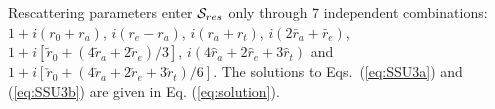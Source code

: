 \documentclass[aps,preprint,floats,epsf,epsfig,nofootinbib,letter]{revtex4}
\newcommand{\ov}{\overline}
\newcommand{\Sc}{{\cal S}}
\newcommand{\T}{{\cal T}}
\begin{document}





%








Rescattering
parameters enter $\Sc_{res}$ only through 7 independent
combinations: $1+i(r_0+r_a)$, $i(r_e-r_a)$, $i(r_a+r_t)$, $i(2\bar
r_a+\bar r_e)$, $1+i[\tilde r_0+(4\tilde r_a+2\tilde r_e)/3]$,
$i(4\hat r_a+2\hat r_e+3\hat r_t)$ and $1+i[\check r_0+(4\check
r_a+2\check r_e+3\check r_t)/6]$. 
The solutions to Eqs.~(\ref{eq:SSU3a}) and
(\ref{eq:SSU3b}) are given in Eq. (\ref{eq:solution}).
\end{document}
